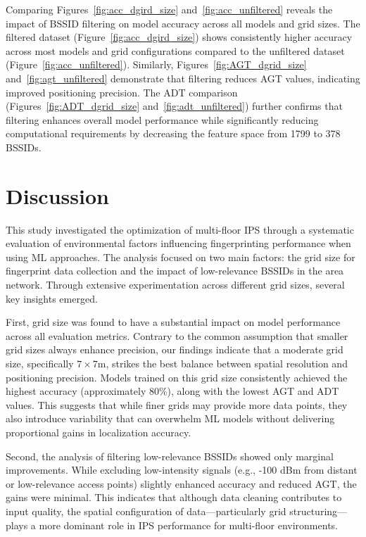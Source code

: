 \documentclass[runningheads]{llncs}
\begin{document}
Comparing Figures~\ref{fig:acc_dgird_size} and~\ref{fig:acc_unfiltered} reveals the impact of BSSID filtering on model accuracy across all models and grid sizes. The filtered dataset (Figure~\ref{fig:acc_dgird_size}) shows consistently higher accuracy across most models and grid configurations compared to the unfiltered dataset (Figure~\ref{fig:acc_unfiltered}). Similarly, Figures~\ref{fig:AGT_dgrid_size} and~\ref{fig:agt_unfiltered} demonstrate that filtering reduces AGT values, indicating improved positioning precision. The ADT comparison (Figures~\ref{fig:ADT_dgrid_size} and~\ref{fig:adt_unfiltered}) further confirms that filtering enhances overall model performance while significantly reducing computational requirements by decreasing the feature space from 1799 to 378 BSSIDs.

\section{Discussion}\label{sec:discussion}

This study investigated the optimization of multi-floor IPS through a systematic evaluation of environmental factors influencing fingerprinting performance when using ML approaches. The analysis focused on two main factors: the grid size for fingerprint data collection and the impact of low-relevance BSSIDs in the area network. Through extensive experimentation across different grid sizes, several key insights emerged.

First, grid size was found to have a substantial impact on model performance across all evaluation metrics. Contrary to the common assumption that smaller grid sizes always enhance precision, our findings indicate that a moderate grid size, specifically $7\times7$m, strikes the best balance between spatial resolution and positioning precision. Models trained on this grid size consistently achieved the highest accuracy (approximately 80\%), along with the lowest AGT and ADT values. This suggests that while finer grids may provide more data points, they also introduce variability that can overwhelm ML models without delivering proportional gains in localization accuracy.

Second, the analysis of filtering low-relevance BSSIDs showed only marginal improvements. While excluding low-intensity signals (e.g., -100 dBm from distant or low-relevance access points) slightly enhanced accuracy and reduced AGT, the gains were minimal. This indicates that although data cleaning contributes to input quality, the spatial configuration of data—particularly grid structuring—plays a more dominant role in IPS performance for multi-floor environments.
\end{document}
